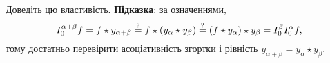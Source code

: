 \begin{exercise}
    Доведіть цю властивість. \textbf{Підказка}: за означеннями,
    \begin{equation}
        I_0^{\alpha + \beta} f = f \star y_{\alpha + \beta} \overset{?}{=} f \star (y_\alpha \star y_\beta) \overset{?}{=} (f \star y_\alpha) \star y_\beta = I_0^{\beta} I_0^{\alpha} f,
    \end{equation}
    тому достатньо перевірити асоціативність згортки і рівність $y_{\alpha + \beta} = y_\alpha \star y_\beta$.
\end{exercise}
        
